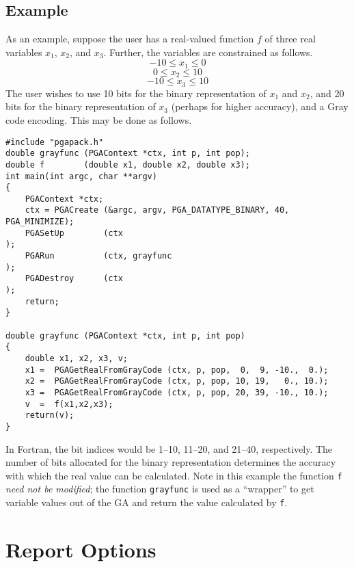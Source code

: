 \documentclass{report}
\begin{document}
\subsection{Example}
\label{subsec:example}

As an example, suppose the user has a real-valued function $f$ of three real
variables $x_1$, $x_2$, and $x_3$.  Further, the variables are constrained as
follows.
\begin{displaymath}
-10 \leq x_1 \leq 0 
\end{displaymath}
\begin{displaymath}
0   \leq x_2 \leq 10
\end{displaymath}
\begin{displaymath}
-10 \leq x_3 \leq 10
\end{displaymath}
The user wishes to use 10 bits for the binary representation of $x_1$ and
$x_2$, and 20 bits for the binary representation of $x_3$ (perhaps for higher
accuracy), and a Gray code encoding.  This may be done as follows.
\begin{verbatim}
#include "pgapack.h"
double grayfunc (PGAContext *ctx, int p, int pop);
double f        (double x1, double x2, double x3);
int main(int argc, char **argv)
{
    PGAContext *ctx; 
    ctx = PGACreate (&argc, argv, PGA_DATATYPE_BINARY, 40, PGA_MINIMIZE);
    PGASetUp        (ctx                                               );
    PGARun          (ctx, grayfunc                                     );
    PGADestroy      (ctx                                               );
    return;
}

double grayfunc (PGAContext *ctx, int p, int pop)
{
    double x1, x2, x3, v;
    x1 =  PGAGetRealFromGrayCode (ctx, p, pop,  0,  9, -10.,  0.);
    x2 =  PGAGetRealFromGrayCode (ctx, p, pop, 10, 19,   0., 10.);
    x3 =  PGAGetRealFromGrayCode (ctx, p, pop, 20, 39, -10., 10.);
    v  =  f(x1,x2,x3);
    return(v);
}
\end{verbatim}
In Fortran, the bit indices would be 1--10, 11--20, and 21--40, respectively.
The number of bits allocated for the binary representation determines the
accuracy with which the real value can be calculated.  Note in this
example  the function {\tt f} {\em need not be modified}; the function
{\tt grayfunc} is used as a ``wrapper'' to get variable values out of the GA
and return the value calculated by {\tt f}.

\section{Report Options}\label{sec:report}
\end{document}
